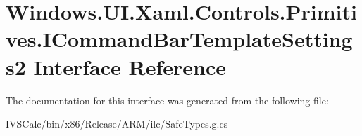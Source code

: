 \hypertarget{interface_windows_1_1_u_i_1_1_xaml_1_1_controls_1_1_primitives_1_1_i_command_bar_template_settings2}{}\section{Windows.\+U\+I.\+Xaml.\+Controls.\+Primitives.\+I\+Command\+Bar\+Template\+Settings2 Interface Reference}
\label{interface_windows_1_1_u_i_1_1_xaml_1_1_controls_1_1_primitives_1_1_i_command_bar_template_settings2}


The documentation for this interface was generated from the following file\+:\begin{DoxyCompactItemize}
\item 
I\+V\+S\+Calc/bin/x86/\+Release/\+A\+R\+M/ilc/Safe\+Types.\+g.\+cs\end{DoxyCompactItemize}
